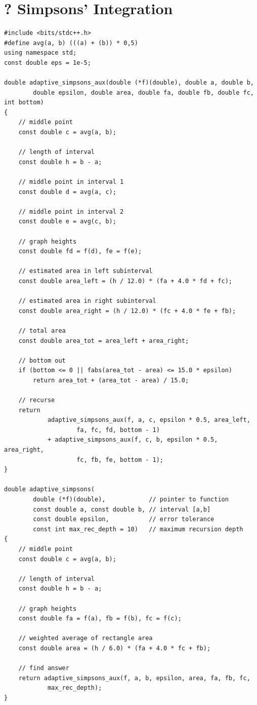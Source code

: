 \documentclass[12pt]{book}
\begin{document}
\section{? Simpsons' Integration}
\begin{verbatim}
#include <bits/stdc++.h>
#define avg(a, b) (((a) + (b)) * 0,5)
using namespace std;
const double eps = 1e-5;

double adaptive_simpsons_aux(double (*f)(double), double a, double b,
		double epsilon, double area, double fa, double fb, double fc, int bottom)
{
	// middle point
	const double c = avg(a, b);

	// length of interval
	const double h = b - a;

	// middle point in interval 1
	const double d = avg(a, c);

	// middle point in interval 2
	const double e = avg(c, b);

	// graph heights
	const double fd = f(d), fe = f(e);

	// estimated area in left subinterval
	const double area_left = (h / 12.0) * (fa + 4.0 * fd + fc);

	// estimated area in right subinterval
	const double area_right = (h / 12.0) * (fc + 4.0 * fe + fb);

	// total area
	const double area_tot = area_left + area_right;

	// bottom out
	if (bottom <= 0 || fabs(area_tot - area) <= 15.0 * epsilon)
		return area_tot + (area_tot - area) / 15.0;

	// recurse
	return
			adaptive_simpsons_aux(f, a, c, epsilon * 0.5, area_left,
					fa, fc, fd, bottom - 1)
			+ adaptive_simpsons_aux(f, c, b, epsilon * 0.5, area_right,
					fc, fb, fe, bottom - 1);
}

double adaptive_simpsons(
		double (*f)(double),            // pointer to function
		const double a, const double b, // interval [a,b]
		const double epsilon,           // error tolerance
		const int max_rec_depth = 10)   // maximum recursion depth
{
	// middle point
	const double c = avg(a, b);

	// length of interval
	const double h = b - a;

	// graph heights
	const double fa = f(a), fb = f(b), fc = f(c);

	// weighted average of rectangle area
	const double area = (h / 6.0) * (fa + 4.0 * fc + fb);

	// find answer
	return adaptive_simpsons_aux(f, a, b, epsilon, area, fa, fb, fc,
			max_rec_depth);
}
\end{verbatim}
\end{document}
